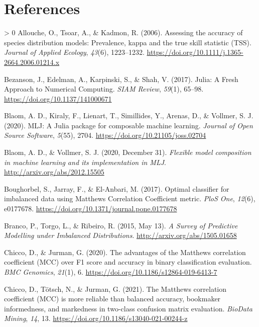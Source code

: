 \documentclass[11pt]{article}
\newlength{\cslhangindent}
\newenvironment{CSLReferences}[3] %
 {%
  \setlength{\parindent}{0pt}
  \ifodd #1 \everypar{\setlength{\hangindent}{\cslhangindent}}\ignorespaces\fi
  \ifnum #2 > 0
  \setlength{\parskip}{#2\baselineskip}
  \fi
 }%
 {}
\begin{document}
\hypertarget{references}{%
\section*{References}\label{references}}

\hypertarget{refs}{}
\begin{CSLReferences}{1}{0}
\leavevmode\hypertarget{ref-Allouche2006AssAcc}{}%
Allouche, O., Tsoar, A., \& Kadmon, R. (2006). Assessing the accuracy of
species distribution models: Prevalence, kappa and the true skill
statistic (TSS). \emph{Journal of Applied Ecology}, \emph{43}(6),
1223--1232. \url{https://doi.org/10.1111/j.1365-2664.2006.01214.x}

\leavevmode\hypertarget{ref-Bezanson2017JulFre}{}%
Bezanson, J., Edelman, A., Karpinski, S., \& Shah, V. (2017). Julia: A
Fresh Approach to Numerical Computing. \emph{SIAM Review}, \emph{59}(1),
65--98. \url{https://doi.org/10.1137/141000671}

\leavevmode\hypertarget{ref-Blaom2020MljJul}{}%
Blaom, A. D., Kiraly, F., Lienart, T., Simillides, Y., Arenas, D., \&
Vollmer, S. J. (2020). MLJ: A Julia package for composable machine
learning. \emph{Journal of Open Source Software}, \emph{5}(55), 2704.
\url{https://doi.org/10.21105/joss.02704}

\leavevmode\hypertarget{ref-Blaom2020FleMod}{}%
Blaom, A. D., \& Vollmer, S. J. (2020, December 31). \emph{Flexible
model composition in machine learning and its implementation in MLJ}.
\url{http://arxiv.org/abs/2012.15505}

\leavevmode\hypertarget{ref-Boughorbel2017OptCla}{}%
Boughorbel, S., Jarray, F., \& El-Anbari, M. (2017). Optimal classifier
for imbalanced data using Matthews Correlation Coefficient metric.
\emph{PloS One}, \emph{12}(6), e0177678.
\url{https://doi.org/10.1371/journal.pone.0177678}

\leavevmode\hypertarget{ref-Branco2015SurPre}{}%
Branco, P., Torgo, L., \& Ribeiro, R. (2015, May 13). \emph{A Survey of
Predictive Modelling under Imbalanced Distributions}.
\url{http://arxiv.org/abs/1505.01658}

\leavevmode\hypertarget{ref-Chicco2020AdvMat}{}%
Chicco, D., \& Jurman, G. (2020). The advantages of the Matthews
correlation coefficient (MCC) over F1 score and accuracy in binary
classification evaluation. \emph{BMC Genomics}, \emph{21}(1), 6.
\url{https://doi.org/10.1186/s12864-019-6413-7}

\leavevmode\hypertarget{ref-Chicco2021MatCor}{}%
Chicco, D., Tötsch, N., \& Jurman, G. (2021). The Matthews correlation
coefficient (MCC) is more reliable than balanced accuracy, bookmaker
informedness, and markedness in two-class confusion matrix evaluation.
\emph{BioData Mining}, \emph{14}, 13.
\url{https://doi.org/10.1186/s13040-021-00244-z}


\end{CSLReferences}
\end{document}

